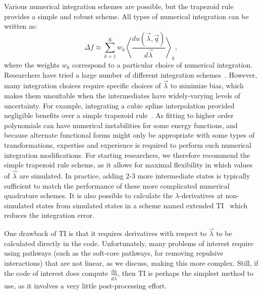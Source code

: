 \documentclass[9pt,bestpractices]{livecoms}
\newcommand{\expect}[1]{\left\langle{#1}\right\rangle}
\begin{document}
Various numerical integration schemes are possible, but the trapezoid
rule provides a simple and robust scheme. All types of numerical integration can be written as:
\[ \Delta f \approx \sum_{k=1}^{K} w_k
\expect{\frac{du(\vec{\lambda},\vec{q})}{d\vec{\lambda}}}_{k}, \] where the weights $w_k$ correspond to a particular choice of numerical integration.
Researchers have tried a large number of different integration schemes~\cite{resat1993studies,jorge2010effect,shyu2009reducing}. However, many integration choices require specific choices of $\vec{\lambda}$ to minimize bias, which makes them unsuitable when the intermediates
have widely-varying levels of uncertainty. For example, integrating a cubic spline interpolation provided negligible benefits over a simple trapezoid rule~\cite{paliwal2011benchmark}. As fitting to higher order polynomials can have numerical instabilities for some energy functions, and because alternate functional forms might only be appropriate with some types of transformations, expertise and experience is required to perform such numerical integration modifications. For starting researchers, we therefore recommend the simple trapezoid rule scheme, as it allows for maximal flexibility in which values of $\vec{\lambda}$ are simulated. In practice, adding 2-3 more intermediate states is typically sufficient to match the performance of these more complicated numerical quadrature schemes. It is also possible to calculate the $\lambda$-derivatives at non-simulated states from simulated states in a scheme named extended TI~\cite{ruiter2016extended} which reduces the integration error.

One drawback of TI is that it requires derivatives with respect to $\vec{\lambda}$ to be calculated directly in the code. Unfortunately, many problems of interest require using pathways (such as the soft-core pathways, for removing repulsive interactions) that are not linear, as we discuss, making this more complex. Still, if the code of interest does compute $\frac{du}{d\vec{\lambda}}$, then TI is perhaps the simplest method to use, as it involves a very little post-processing effort.
\end{document}

